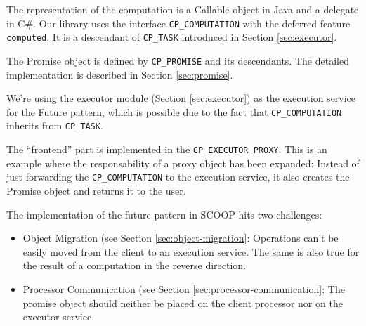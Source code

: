 The representation of the computation is a Callable object in Java and a delegate in C\#.
Our library uses the interface \lstinline!CP_COMPUTATION! with the deferred feature \lstinline!computed!.
It is a descendant of \lstinline!CP_TASK! introduced in Section \ref{sec:executor}.

The Promise object is defined by \lstinline!CP_PROMISE! and its descendants.
The detailed implementation is described in Section \ref{sec:promise}.

We're using the executor module (Section \ref{sec:executor}) as the execution service for the Future pattern, which is possible due to the fact that \lstinline!CP_COMPUTATION! inherits from \lstinline!CP_TASK!.
% 
% 

The ``frontend'' part is implemented in the \lstinline!CP_EXECUTOR_PROXY!.
This is an example where the responsability of a proxy object has been expanded:
Instead of just forwarding the \lstinline!CP_COMPUTATION! to the execution service, it also creates the Promise object and returns it to the user.

The implementation of the future pattern in SCOOP hits two challenges:
\begin{itemize}
 \item Object Migration (see Section \ref{sec:object-migration}: Operations can't be easily moved from the client to an execution service.
 The same is also true for the result of a computation in the reverse direction.
 \item Processor Communication (see Section \ref{sec:processor-communication}: The promise object should neither be placed on the client processor nor on the executor service.
\end{itemize}

